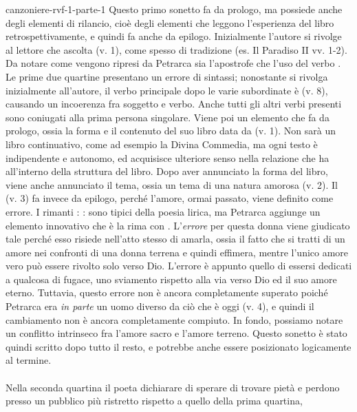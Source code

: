 \documentclass[preview]{standalone}
\begin{document}
\begin{snippet}{canzoniere-rvf-1-parte-1}
    Questo primo sonetto fa da prologo, ma possiede anche degli elementi di rilancio,
    cioè degli elementi che leggono l'esperienza del libro retrospettivamente,
    e quindi fa anche da epilogo.
    Inizialmente l'autore si rivolge al lettore che ascolta (v. 1), come spesso di tradizione 
    (es. Il Paradiso II  vv. 1-2).
    Da notare come vengono ripresi da Petrarca sia l'apostrofe che l'uso del verbo .
    Le prime due quartine presentano un errore di sintassi; nonostante si rivolga inizialmente all'autore,
    il verbo principale dopo le varie subordinate è  (v. 8), causando un incoerenza fra soggetto e verbo.
    Anche tutti gli altri verbi presenti sono coniugati alla prima persona singolare.
    Viene poi un elemento che fa da prologo, ossia la forma e il contenuto del suo libro data da  (v. 1).
    Non sarà un libro continuativo, come ad esempio la Divina Commedia, ma ogni testo è indipendente e autonomo,
    ed acquisisce ulteriore senso nella relazione che ha all'interno della struttura del libro.
    Dopo aver annunciato la forma del libro, viene anche annunciato il tema, ossia
    un tema di una natura amorosa (v. 2).
    Il (v. 3) fa invece da epilogo, perché l'amore, ormai passato, viene definito come errore.
    I rimanti  :  :  sono tipici della poesia lirica, ma Petrarca
    aggiunge un elemento innovativo che è la rima con .
    L'\textit{errore} per questa donna viene giudicato tale perché esso risiede nell'atto stesso di amarla,
    ossia il fatto che si tratti di un amore nei confronti di una donna terrena e quindi effimera, mentre l'unico amore
    vero può essere rivolto solo verso Dio. L'errore è appunto quello di essersi dedicati a qualcosa di fugace,
    uno sviamento rispetto alla via verso Dio ed il suo amore eterno.
    Tuttavia, questo errore non è ancora completamente superato poiché Petrarca
    era \textit{in parte} un uomo diverso da ciò che è oggi (v. 4), e quindi il cambiamento non è ancora
    completamente compiuto.
    In fondo, possiamo notare un conflitto intrinseco fra l'amore sacro e l'amore terreno.
    Questo sonetto è stato quindi scritto dopo tutto il resto, e potrebbe anche essere posizionato
    logicamente al termine.
    \\\\
    Nella seconda quartina il poeta dichiarare di sperare di trovare pietà e perdono
    presso un pubblico più ristretto rispetto a quello della prima quartina,

\end{snippet}
\end{document}
